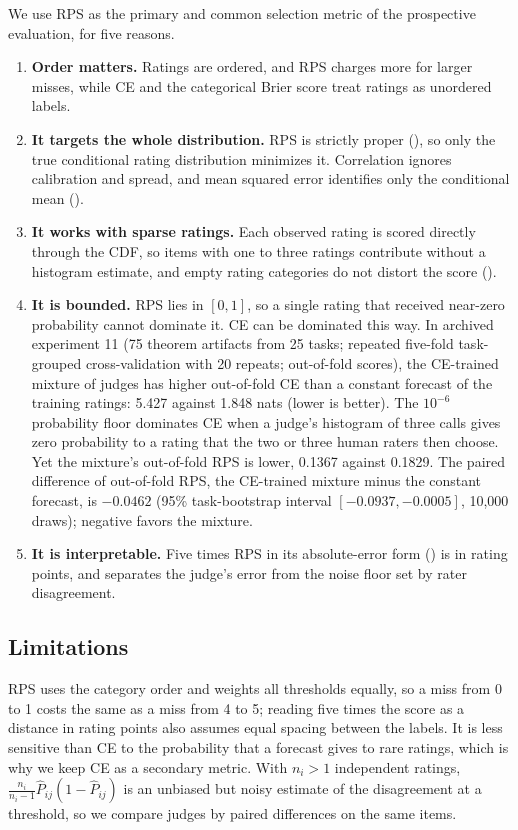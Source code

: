 We use RPS as the primary and common selection metric of the prospective evaluation, for five reasons.
\begin{enumerate}
\item \textbf{Order matters.} Ratings are ordered, and RPS charges more for larger misses, while CE and the categorical Brier score treat ratings as unordered labels.
\item \textbf{It targets the whole distribution.} RPS is strictly proper (), so only the true conditional rating distribution minimizes it. Correlation ignores calibration and spread, and mean squared error identifies only the conditional mean ().
\item \textbf{It works with sparse ratings.} Each observed rating is scored directly through the CDF, so items with one to three ratings contribute without a histogram estimate, and empty rating categories do not distort the score ().
\item \textbf{It is bounded.} RPS lies in $[0,1]$, so a single rating that received near-zero probability cannot dominate it. CE can be dominated this way. In archived experiment 11 (75 theorem artifacts from 25 tasks; repeated five-fold task-grouped cross-validation with 20 repeats; out-of-fold scores), the CE-trained mixture of judges has higher out-of-fold CE than a constant forecast of the training ratings: 5.427 against 1.848 nats (lower is better). The $10^{-6}$ probability floor dominates CE when a judge's histogram of three calls gives zero probability to a rating that the two or three human raters then choose. Yet the mixture's out-of-fold RPS is lower, 0.1367 against 0.1829. The paired difference of out-of-fold RPS, the CE-trained mixture minus the constant forecast, is $-0.0462$ (95\% task-bootstrap interval $[-0.0937,-0.0005]$, 10{,}000 draws); negative favors the mixture.
\item \textbf{It is interpretable.} Five times RPS in its absolute-error form () is in rating points, and  separates the judge's error from the noise floor set by rater disagreement.
\end{enumerate}

\subsection{Limitations}
\label{app:rps-limits}

RPS uses the category order and weights all thresholds equally, so a miss from 0 to 1 costs the same as a miss from 4 to 5; reading five times the score as a distance in rating points also assumes equal spacing between the labels.
It is less sensitive than CE to the probability that a forecast gives to rare ratings, which is why we keep CE as a secondary metric.
With $n_i>1$ independent ratings, $\frac{n_i}{n_i-1}\hat P_{ij}(1-\hat P_{ij})$ is an unbiased but noisy estimate of the disagreement at a threshold, so we compare judges by paired differences on the same items.


